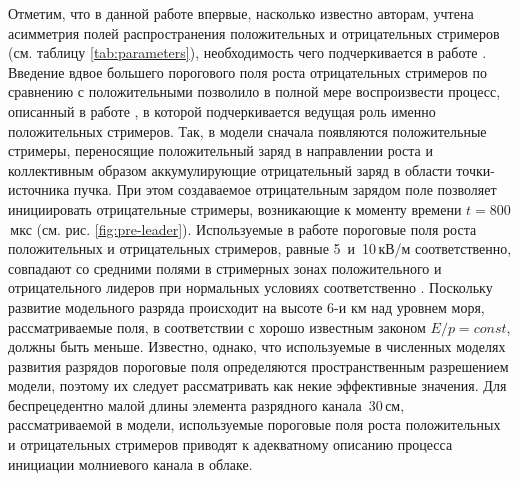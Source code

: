 Отметим, что в данной работе впервые, насколько известно авторам, учтена асимметрия полей распространения положительных и отрицательных стримеров (см. таблицу \ref{tab:parameters}), необходимость чего подчеркивается в работе \cite{VanderVelde2013}. Введение вдвое большего порогового поля роста отрицательных стримеров по сравнению с положительными позволило в полной мере воспроизвести процесс, описанный в работе \cite{Griffiths1976}, в которой подчеркивается ведущая роль именно положительных стримеров. Так, в модели сначала появляются положительные стримеры, переносящие положительный заряд в направлении роста и коллективным образом аккумулирующие отрицательный заряд в области точки-источника пучка. При этом создаваемое отрицательным зарядом поле позволяет инициировать отрицательные стримеры, возникающие к моменту времени $t = 800$\,мкс (см. рис. \ref{fig:pre-leader}). Используемые в работе пороговые поля роста положительных и отрицательных стримеров, равные 5~и~10\,кВ/м соответственно, совпадают со средними полями в стримерных зонах положительного и отрицательного лидеров при нормальных условиях соответственно \cite{Bazelyan1997}. Поскольку развитие модельного разряда происходит на высоте 6-и км над уровнем моря, рассматриваемые поля, в соответствии с хорошо известным законом $E/p=const$, должны быть меньше. Известно, однако, что используемые в численных моделях развития разрядов пороговые поля определяются пространственным разрешением модели, поэтому их следует рассматривать как некие эффективные значения. Для беспрецедентно малой длины элемента разрядного канала~30\,см, рассматриваемой в модели, используемые пороговые поля роста положительных и отрицательных стримеров приводят к адекватному описанию процесса инициации молниевого канала в облаке.   

